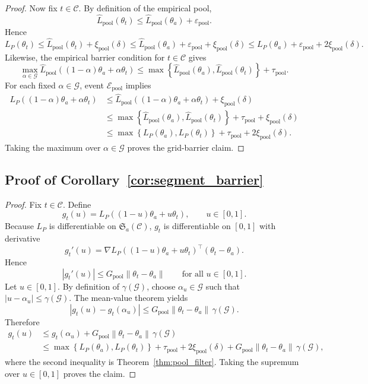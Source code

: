 \documentclass{article}
\newcommand{\cC}{\mathcal{C}}
\newcommand{\norm}[1]{\left\lVert #1 \right\rVert}
\newcommand{\abs}[1]{\left\lvert #1 \right\rvert}
\newcommand{\paren}[1]{\left( #1 \right)}
\newcommand{\braces}[1]{\left\{ #1 \right\}}
\begin{document}
\begin{proof}
Now fix \(t\in\cC\). By definition of the empirical pool,
\[
\widehat L_{\mathrm{pool}}(\theta_t)
\le
\widehat L_{\mathrm{pool}}(\theta_a) + \varepsilon_{\mathrm{pool}}.
\]
Hence
\[
L_P(\theta_t)
\le
\widehat L_{\mathrm{pool}}(\theta_t) + \xi_{\mathrm{pool}}(\delta)
\le
\widehat L_{\mathrm{pool}}(\theta_a) + \varepsilon_{\mathrm{pool}} + \xi_{\mathrm{pool}}(\delta)
\le
L_P(\theta_a) + \varepsilon_{\mathrm{pool}} + 2\xi_{\mathrm{pool}}(\delta).
\]
Likewise, the empirical barrier condition for \(t\in\cC\) gives
\[
\max_{\alpha\in\mathcal G}
\widehat L_{\mathrm{pool}}\!\paren{(1-\alpha)\theta_a+\alpha\theta_t}
\le
\max\braces{\widehat L_{\mathrm{pool}}(\theta_a),\widehat L_{\mathrm{pool}}(\theta_t)}
+
\tau_{\mathrm{pool}}.
\]
For each fixed \(\alpha\in\mathcal G\), event \(\mathcal E_{\mathrm{pool}}\) implies
\begin{align*}
L_P\!\paren{(1-\alpha)\theta_a+\alpha\theta_t}
&\le
\widehat L_{\mathrm{pool}}\!\paren{(1-\alpha)\theta_a+\alpha\theta_t}
+
\xi_{\mathrm{pool}}(\delta) \\
&\le
\max\braces{\widehat L_{\mathrm{pool}}(\theta_a),\widehat L_{\mathrm{pool}}(\theta_t)}
+
\tau_{\mathrm{pool}}
+
\xi_{\mathrm{pool}}(\delta) \\
&\le
\max\braces{L_P(\theta_a),L_P(\theta_t)}
+
\tau_{\mathrm{pool}}
+
2\xi_{\mathrm{pool}}(\delta).
\end{align*}
Taking the maximum over \(\alpha\in\mathcal G\) proves the grid-barrier claim.
\end{proof}

\subsection{Proof of Corollary~\ref{cor:segment_barrier}}

\begin{proof}
Fix \(t\in\cC\). Define
\[
g_t(u) = L_P\!\paren{(1-u)\theta_a + u\theta_t},
\qquad
u\in[0,1].
\]
Because \(L_P\) is differentiable on \(\mathfrak S_a(\cC)\), \(g_t\) is differentiable on \([0,1]\) with derivative
\[
g_t'(u)
=
\nabla L_P\!\paren{(1-u)\theta_a+u\theta_t}^\top (\theta_t-\theta_a).
\]
Hence
\[
\abs{g_t'(u)}
\le
G_{\mathrm{pool}}\norm{\theta_t-\theta_a}
\qquad
\text{for all } u\in[0,1].
\]
Let \(u\in[0,1]\). By definition of \(\gamma(\mathcal G)\), choose \(\alpha_u\in\mathcal G\) such that \(\abs{u-\alpha_u}\le \gamma(\mathcal G)\). The mean-value theorem yields
\[
\abs{g_t(u)-g_t(\alpha_u)}
\le
G_{\mathrm{pool}}\norm{\theta_t-\theta_a}\,\gamma(\mathcal G).
\]
Therefore
\begin{align*}
g_t(u)
&\le
g_t(\alpha_u) + G_{\mathrm{pool}}\norm{\theta_t-\theta_a}\,\gamma(\mathcal G) \\
&\le
\max\braces{L_P(\theta_a),L_P(\theta_t)}
+
\tau_{\mathrm{pool}}
+
2\xi_{\mathrm{pool}}(\delta)
+
G_{\mathrm{pool}}\norm{\theta_t-\theta_a}\,\gamma(\mathcal G),
\end{align*}
where the second inequality is Theorem~\ref{thm:pool_filter}. Taking the supremum over \(u\in[0,1]\) proves the claim.
\end{proof}
\end{document}
